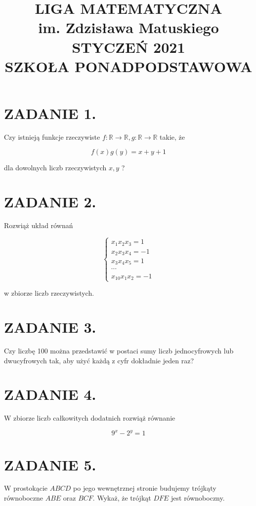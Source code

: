 \documentclass[10pt]{article}
\title{LIGA MATEMATYCZNA \\
 im. Zdzisława Matuskiego \\
 STYCZEŃ 2021 \\
 SZKOŁA PONADPODSTAWOWA }
\author{}
\date{}
\begin{document}
\maketitle
\section*{ZADANIE 1.}
Czy istnieją funkcje rzeczywiste \(f: \mathbb{R} \rightarrow \mathbb{R}, g: \mathbb{R} \rightarrow \mathbb{R}\) takie, że

\[
f(x) g(y)=x+y+1
\]

dla dowolnych liczb rzeczywistych \(x, y\) ?

\section*{ZADANIE 2.}
Rozwiąż układ równań

\[
\left\{\begin{array}{l}
x_{1} x_{2} x_{3}=1 \\
x_{2} x_{3} x_{4}=-1 \\
x_{3} x_{4} x_{5}=1 \\
\cdots \\
x_{10} x_{1} x_{2}=-1
\end{array}\right.
\]

w zbiorze liczb rzeczywistych.

\section*{ZADANIE 3.}
Czy liczbę 100 można przedstawić w postaci sumy liczb jednocyfrowych lub dwucyfrowych tak, aby użyć każdą z cyfr dokładnie jeden raz?

\section*{ZADANIE 4.}
W zbiorze liczb całkowitych dodatnich rozwiąż równanie

\[
9^{x}-2^{y}=1
\]

\section*{ZADANIE 5.}
W prostokącie \(A B C D\) po jego wewnętrznej stronie budujemy trójkąty równoboczne \(A B E\) oraz \(B C F\). Wykaż, że trójkąt \(D F E\) jest równoboczny.
\end{document}
